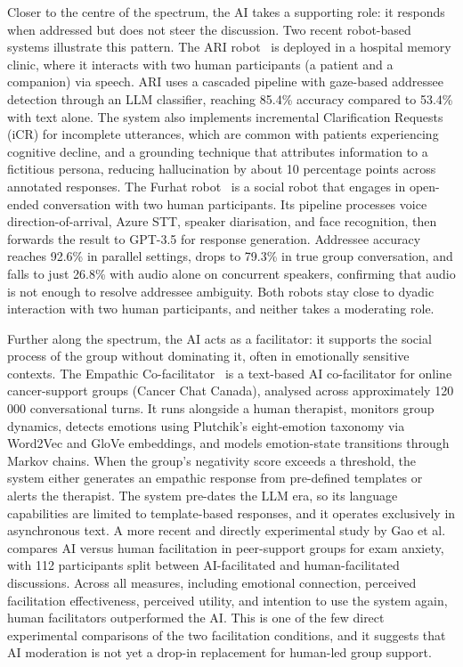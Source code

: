 Closer to the centre of the spectrum, the AI takes a supporting role: it responds when addressed but does not steer the discussion. Two recent robot-based systems illustrate this pattern. The ARI robot~\cite{addlesee2024ari} is deployed in a hospital memory clinic, where it interacts with two human participants (a patient and a companion) via speech. ARI uses a cascaded pipeline with gaze-based addressee detection through an LLM classifier, reaching 85.4\% accuracy compared to 53.4\% with text alone. The system also implements incremental Clarification Requests (iCR) for incomplete utterances, which are common with patients experiencing cognitive decline, and a grounding technique that attributes information to a fictitious persona, reducing hallucination by about 10 percentage points across annotated responses. The Furhat robot~\cite{axelsson2025furhat} is a social robot that engages in open-ended conversation with two human participants. Its pipeline processes voice direction-of-arrival, Azure STT, speaker diarisation, and face recognition, then forwards the result to GPT-3.5 for response generation. Addressee accuracy reaches 92.6\% in parallel settings, drops to 79.3\% in true group conversation, and falls to just 26.8\% with audio alone on concurrent speakers, confirming that audio is not enough to resolve addressee ambiguity. Both robots stay close to dyadic interaction with two human participants, and neither takes a moderating role.

Further along the spectrum, the AI acts as a facilitator: it supports the social process of the group without dominating it, often in emotionally sensitive contexts. The Empathic Co-facilitator~\cite{adikari2022empathic} is a text-based AI co-facilitator for online cancer-support groups (Cancer Chat Canada), analysed across approximately 120\,000 conversational turns. It runs alongside a human therapist, monitors group dynamics, detects emotions using Plutchik's eight-emotion taxonomy via Word2Vec and GloVe embeddings, and models emotion-state transitions through Markov chains. When the group's negativity score exceeds a threshold, the system either generates an empathic response from pre-defined templates or alerts the therapist. The system pre-dates the LLM era, so its language capabilities are limited to template-based responses, and it operates exclusively in asynchronous text. A more recent and directly experimental study by Gao et al.~\cite{gao2025facilitation} compares AI versus human facilitation in peer-support groups for exam anxiety, with 112 participants split between AI-facilitated and human-facilitated discussions. Across all measures, including emotional connection, perceived facilitation effectiveness, perceived utility, and intention to use the system again, human facilitators outperformed the AI. This is one of the few direct experimental comparisons of the two facilitation conditions, and it suggests that AI moderation is not yet a drop-in replacement for human-led group support.

